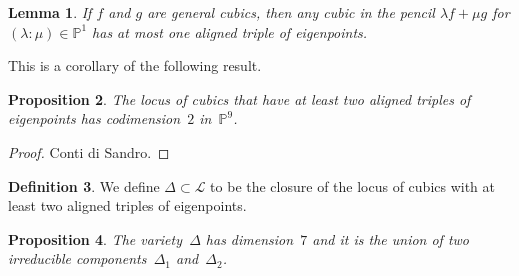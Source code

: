 \documentclass[11pt, a4paper, reqno, captions=tableheading,bibliography=totoc]{scrartcl}
\theoremstyle{plain}
\newtheorem{lemma}{Lemma}[section]
\newtheorem{prop}[lemma]{Proposition}
\theoremstyle{definition}
\newtheorem{definition}[lemma]{Definition}
\newcommand{\p}{\mathbb{P}}
\begin{document}
\begin{lemma}
\label{lemma:pencil_one_aligned}
 If $f$ and $g$ are general cubics, then any cubic in the pencil $\lambda f + \mu g$ for $(\lambda: \mu) \in \p^1$ has at most one aligned triple of eigenpoints.
\end{lemma}

This is a corollary of the following result.

\begin{prop}
    The locus of cubics that have at least two aligned triples of eigenpoints has codimension~$2$ in~$\p^9$.
\end{prop}
\begin{proof}
    Conti di Sandro.
\end{proof}

\begin{definition}
 We define $\Delta \subset \mathcal{L}$ to be the closure of the locus of cubics with at least two aligned triples of eigenpoints.
\end{definition}

\begin{prop}
  The variety~$\Delta$ has dimension~$7$ and it is the union of two irreducible components~$\Delta_1$ and~$\Delta_2$.
\end{prop}
\end{document}
